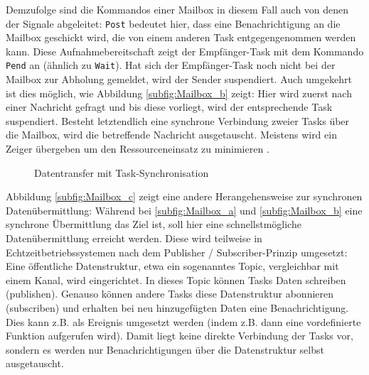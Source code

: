 \documentclass{llncs}
\begin{document}
Demzufolge sind die Kommandos einer Mailbox in diesem Fall auch von denen der Signale abgeleitet: \texttt{Post} bedeutet hier, dass eine Benachrichtigung an die Mailbox geschickt wird, die von einem anderen Task entgegengenommen werden kann. Diese Aufnahmebereitschaft zeigt der Empfänger-Task mit dem Kommando \texttt{Pend} an (ähnlich zu \texttt{Wait}). Hat sich der Empfänger-Task noch nicht bei der Mailbox zur Abholung gemeldet, wird der Sender suspendiert. Auch umgekehrt ist dies möglich, wie Abbildung \ref{subfig:Mailbox_b} zeigt: Hier wird zuerst nach einer Nachricht gefragt und bis diese vorliegt, wird der entsprechende Task suspendiert. Besteht letztendlich eine synchrone Verbindung zweier Tasks über die Mailbox, wird die betreffende Nachricht ausgetauscht. Meistens wird ein Zeiger übergeben um den Ressourceneinsatz zu minimieren \autocite[vgl.][99]{Cooling2017}.
\begin{figure}[h]
	\centering
	\begin{subfigure}{.40\columnwidth} %
		\def\svgwidth{\columnwidth}
		
	\end{subfigure}
	\caption{\label{fig:Mailbox_gesamt}Datentransfer mit Task-Synchronisation \autocite[vgl.][99]{Cooling2017}}
\end{figure}
Abbildung \ref{subfig:Mailbox_c} zeigt eine andere Herangehensweise zur synchronen Datenübermittlung: Während bei \ref{subfig:Mailbox_a} und \ref{subfig:Mailbox_b} eine synchrone Übermittlung das Ziel ist, soll hier eine schnellstmögliche Datenübermittlung erreicht werden. Diese wird teilweise in Echtzeitbetriebssystemen nach dem Publisher / Subscriber-Prinzip umgesetzt: Eine öffentliche Datenstruktur, etwa ein sogenanntes Topic, vergleichbar mit einem Kanal, wird eingerichtet. In dieses Topic können Tasks Daten schreiben (publishen). Genauso können andere Tasks diese Datenstruktur abonnieren (subscriben) und erhalten bei neu hinzugefügten Daten eine Benachrichtigung. Dies kann z.B. als Ereignis umgesetzt werden (indem z.B. dann eine vordefinierte Funktion aufgerufen wird). Damit liegt keine direkte Verbindung der Tasks vor, sondern es werden nur Benachrichtigungen über die Datenstruktur selbst ausgetauscht.\\
\end{document}
